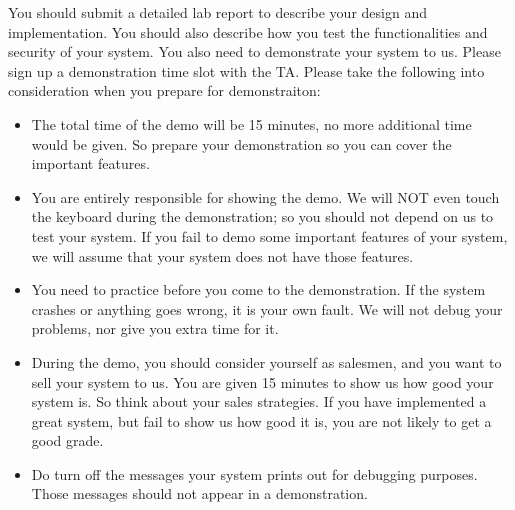 



You should submit a detailed lab report to describe your design and implementation.
You should also describe how you test the functionalities and
security of your system. You also need to demonstrate your system to us. 
Please sign up a demonstration time slot with the TA. Please take
the following into consideration when you prepare for demonstraiton:

\begin{itemize}

\item The total time of the demo will be 15 minutes, no more additional time would be
given. So prepare your demonstration so you can cover the important features.  

\item You are entirely responsible for showing the demo. 
We will NOT even touch the keyboard during the
demonstration; so you should not depend on us to test your system. If you fail to demo
some important features of your system, we will assume that your system does not
have those features. 

\item You need to practice before you come to the demonstration. 
If the system crashes or anything goes wrong, it is your own fault. We will not 
debug your problems, nor give you extra time for it. 

\item 
During the demo, you should consider yourself as salesmen, and you want to sell
your system to us. You are given 15 minutes to show us how good your system is.
So think about your sales strategies. If you have implemented a great system,
but fail to show us how good it is, you are not likely to get a good grade. 

\item 
Do turn off the messages your system prints out for debugging purposes. 
Those messages should not appear in a demonstration.


\end{itemize}


